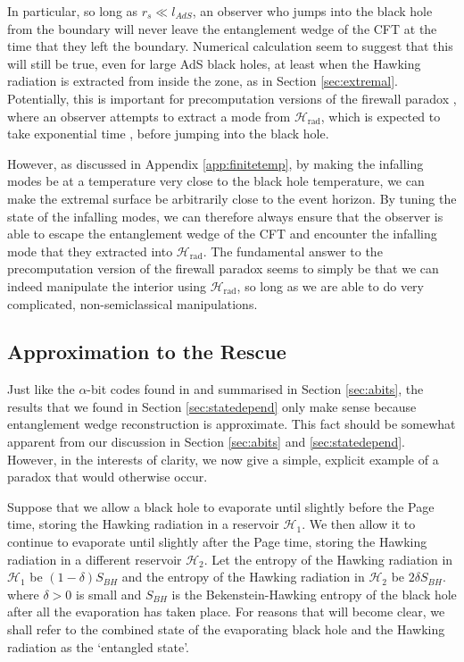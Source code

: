 \documentclass[12pt]{article}
\begin{document}
In particular, so long as $r_s \ll l_{AdS}$, an observer who jumps into the black hole from the boundary will never leave the entanglement wedge of the CFT at the time that they left the boundary. Numerical calculation seem to suggest that this will still be true, even for large AdS black holes, at least when the Hawking radiation is extracted from inside the zone, as in Section \ref{sec:extremal}. Potentially, this is important for precomputation versions of the firewall paradox \cite{almheiri2013apologia}, where an observer attempts to extract a mode from $\mathcal{H}_\text{rad}$, which is expected to take exponential time \cite{harlow2013quantum}, before jumping into the black hole. 

However, as discussed in Appendix \ref{app:finitetemp}, by making the infalling modes be at a temperature very close to the black hole temperature, we can make the extremal surface be arbitrarily close to the event horizon. By tuning the state of the infalling modes, we can therefore always ensure that the observer is able to escape the entanglement wedge of the CFT and encounter the infalling mode that they extracted into $\mathcal{H}_\text{rad}$. The fundamental answer to the precomputation version of the firewall paradox seems to simply be that we can indeed manipulate the interior using $\mathcal{H}_\text{rad}$, so long as we are able to do very complicated, non-semiclassical manipulations.

\subsection{Approximation to the Rescue} \label{sec:approx}

Just like the $\alpha$-bit codes found in \cite{hayden2018learning} and summarised in Section \ref{sec:abits}, the results that we found in Section \ref{sec:statedepend} only make sense because entanglement wedge reconstruction is approximate. This fact should be somewhat apparent from our discussion in Section \ref{sec:abits} and \ref{sec:statedepend}. However, in the interests of clarity, we now give a simple, explicit example of a paradox that would otherwise occur.

Suppose that we allow a black hole to evaporate until slightly before the Page time, storing the Hawking radiation in a reservoir $\mathcal{H}_{1}$. We then allow it to continue to evaporate until slightly after the Page time, storing the Hawking radiation in a different reservoir $\mathcal{H}_{2}$. Let the entropy of the Hawking radiation in $\mathcal{H}_{1}$ be $(1-\delta)S_{BH}$ and the entropy of the Hawking radiation in $\mathcal{H}_{2}$ be $2 \delta S_{BH}$. where $\delta>0$ is small and $S_{BH}$ is the Bekenstein-Hawking entropy of the black hole after all the evaporation has taken place. For reasons that will become clear, we shall refer to the combined state of the evaporating black hole and the Hawking radiation as the `entangled state'.
\end{document}
